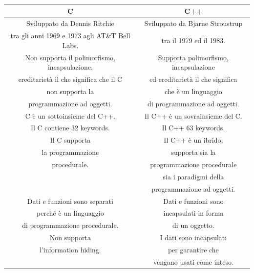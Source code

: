 \begin{longtable}{|c|c|}
	\hline
	\textbf{C} & \textbf{C++} \\
	\hline
	\endhead
	\textsf{\small Sviluppato da Dennis Ritchie } & \textsf{\small Sviluppato da Bjarne Stroustrup } \\
	\textsf{\small tra gli anni 1969 e 1973 agli AT\&T Bell Labs.} & \textsf{\small tra il 1979 ed il 1983.} \\
	\hline
	\textsf{\small Non supporta il polimorfismo, incapsulazione,  } & \textsf{\small Supporta polimorfismo, incapsulazione } \\
	\textsf{\small ereditarietà il che significa che il C} & \textsf{\small ed ereditarietà il che significa} \\
	\textsf{\small non supporta la} & \textsf{\small  che è un linguaggio} \\
	\textsf{\small programmazione ad oggetti.} & \textsf{\small  di programmazione ad oggetti.} \\
	\hline
	\textsf{\small C è un sottoinsieme del C++.} & \textsf{\small Il C++ è un sovrainsieme del C.} \\
	\hline
	\textsf{\small Il C contiene 32 keywords.} & \textsf{\small Il C++ 63 keywords.} \\
	\hline
	\textsf{\small Il C supporta  } & \textsf{\small Il C++ è un ibrido, } \\
	\textsf{\small la programmazione } & \textsf{\small supporta sia la } \\
	\textsf{\small procedurale.} & \textsf{\small programmazione procedurale} \\
	\textsf{\small } & \textsf{\small sia i paradigmi della} \\
	\textsf{\small } & \textsf{\small programmazione ad oggetti.} \\
	\hline
	\textsf{\small Dati e funzioni sono separati} & \textsf{\small Dati e funzioni sono} \\
	\textsf{\small perché è un linguaggio} & \textsf{\small incapsulati in forma} \\
	\textsf{\small di programmazione procedurale.} & \textsf{\small di un oggetto.} \\
	\hline
	\textsf{\small Non supporta } & \textsf{\small I dati sono incapsulati } \\
	\textsf{\small l'information hiding.} & \textsf{\small per garantire che } \\
	\textsf{\small } & \textsf{\small vengano usati come inteso.} \\

\end{longtable}
